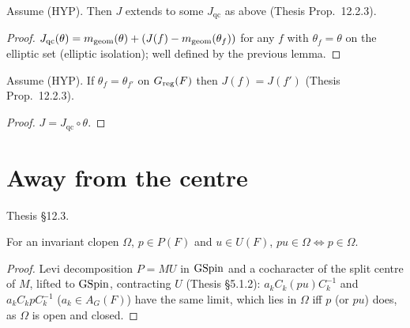 \begin{proposition}
\label{exists_isJqc}
\leanok
{}
Assume (HYP). Then $J$ extends to some $J_{\mathrm{qc}}$ as above (Thesis Prop.~12.2.3).
\end{proposition}
\begin{proof}
\leanok
{}
$J_{\mathrm{qc}}(\theta)=m_{\mathrm{geom}}(\theta)+(J(f)-m_{\mathrm{geom}}(\theta_f))$ for any $f$ with $\theta_f=\theta$ on the elliptic set (elliptic isolation); well defined by the previous lemma.
\end{proof}

\begin{lemma}
\label{distribJ_eq_of_thetaF_eqOn}
\leanok
{}
Assume (HYP). If $\theta_f=\theta_{f'}$ on $G_{\mathrm{reg}}(F)$ then $J(f)=J(f')$ (Thesis Prop.~12.2.3).
\end{lemma}
\begin{proof}
\leanok
{}
$J=J_{\mathrm{qc}}\circ\theta$.
\end{proof}

\section{Away from the centre}
Thesis \S12.3.

\begin{lemma}
\label{mem_mul_parabolicU_iff}
\leanok
{}
For an invariant clopen $\Omega$, $p\in P(F)$ and $u\in U(F)$, $pu\in\Omega\iff p\in\Omega$.
\end{lemma}
\begin{proof}
\leanok
{}
Levi decomposition $P=MU$ in $\mathrm{GSpin}$ and a cocharacter of the split centre of $M$, lifted to $\mathrm{GSpin}$, contracting $U$
(Thesis \S5.1.2): $a_kC_k(pu)C_k^{-1}$ and $a_kC_kpC_k^{-1}$ ($a_k\in A_G(F)$) have the same limit, which lies in $\Omega$
iff $p$ (or $pu$) does, as $\Omega$ is open and closed.
\end{proof}

